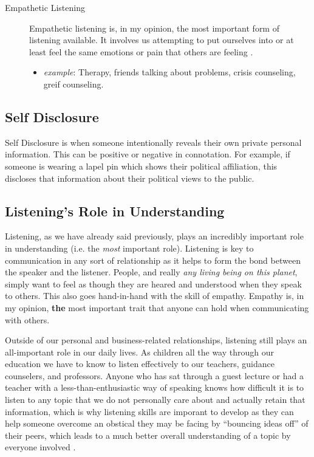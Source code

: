 \documentclass[stu,12pt]{apa7}
\begin{document}
\begin{description}
\begin{itemize}
          \end{itemize}
        \item[Empathetic Listening]
          Empathetic listening is, in my opinion, the most important form of
            listening available. It involves us attempting to put ourselves into
            or at least feel the same emotions or pain that others are feeling
            \parencite[pp. 335--336]{noauthor_communication_2013}.
          \begin{itemize}
            \item \textit{example}: Therapy, friends talking about problems,
              crisis counseling, greif counseling.
          \end{itemize}
      \end{description}

    \subsection{Self Disclosure}
      Self Disclosure is when someone intentionally reveals their own private
        personal information. This can be positive or negative in connotation.
        For example, if someone is wearing a lapel pin which shows their
        political affiliation, this discloses that information about their
        political views to the public.

    \subsection{Listening's Role in Understanding}
      Listening, as we have already said previously, plays an incredibly
        important role in understanding (i.e. the \textit{most} important role).
        Listening is key to communication in any sort of relationship as it
        helps to form the bond between the speaker and the listener. People,
        and really \textit{any living being on this planet}, simply want to feel
        as though they are heared and understood when they speak to others. This
        also goes hand-in-hand with the skill of empathy. Empathy is, in my
        opinion, \textbf{the} most important trait that anyone can hold when
        communicating with others.

      Outside of our personal and business-related relationships, listening
        still plays an all-important role in our daily lives. As children
        all the way through our education we have to know to listen effectively
        to our teachers, guidance counselers, and professors. Anyone who has
        sat through a guest lecture or had a teacher with a
        less-than-enthusiastic way of speaking knows how difficult it is to
        listen to any topic that we do not personally care about and actually
        retain that information, which is why listening skills are imporant to
        develop as they can help someone overcome an obstical they may be facing
        by ``bouncing ideas off'' of their peers, which leads to a much better
        overall understanding of a topic by everyone involved
        \parencite[pp. 5]{caspersz_can_nodate}.
\end{document}
